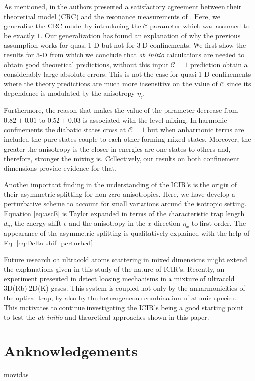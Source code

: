 \documentclass[aps,pre,twocolumn,superscriptaddress,showpacs]{revtex4-1}
\newcommand{\abinitio}{\textit{ab initio }}
\begin{document}
As mentioned, in \cite{PhysRevLett.109.073201} the authors presented a satisfactory agreement between their theoretical model (CRC) and the resonance measurements of \cite{PhysRevLett.104.153203}. Here, we generalize the CRC model by introducing the $\mathcal{C}$ parameter which was assumed to be exactly $1$. Our generalization has found an explanation of why the previous assumption works for quasi 1-D  but not for 3-D confinements. We first show the results for 3-D from which we conclude that \abinitio calculations are needed to obtain good theoretical predictions, without this input $\mathcal{C}=1$ prediction obtain a considerably large absolute errors. This is not the case for quasi 1-D confinements where the theory predictions are much more insensitive on the value of $\mathcal{C}$ since its dependence is modulated by the anisotropy $\eta_z$. 

Furthermore, the reason that makes the value of the parameter decrease from $0.82 \pm 0.01$ to $0.52 \pm 0.03$ is associated with the level mixing. In harmonic confinements the diabatic states cross at $\mathcal{C}=1$ but when anharmonic terms are included the pure states couple to each other forming mixed states. Moreover, the greater the anisotropy is the closer in energies are one states to others and, therefore, stronger the mixing is. Collectively, our results on both confinement dimensions provide evidence for that.

Another important finding in the understanding of the ICIR's is the origin of their asymmetric splitting for non-zero anisotropies. Here, we have develop a perturbative scheme to account for small variations around the isotropic setting. Equation \eqref{eq:ascE} is Taylor expanded in terms of the characteristic trap length $d_y$, the energy shift $\epsilon$ and the anisotropy in the $x$ direction $\eta_x$ to first order. The appearance of the asymmetric splitting is qualitatively explained with the help of Eq. \eqref{eq:Delta shift perturbed}.

Future research on ultracold atoms scattering in mixed dimensions might extend the explanations given in this study of the nature of ICIR's. Recently, an experiment presented in \cite{PhysRevLett.104.153202} detect loosing mechanisms in a mixture of ultracold 3D(Rb)-2D(K) gases. This system is coupled not only by the anharmonicities of the optical trap, by also by the heterogeneous combination of atomic species. This motivates to continue investigating the ICIR's being a good starting point to test the \abinitio and theoretical approaches shown in this paper.
\section{Anknowledgements}
movidas



\end{document}
